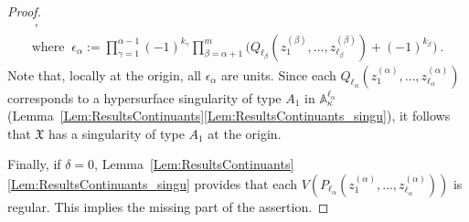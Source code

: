 \documentclass[letter,11pt]{amsart}
\renewcommand{\AA}{\ensuremath{\mathbb{A}}}
\theoremstyle{theorem}
\theoremstyle{definition}
\newcommand{\len}{\ell}
\newcommand{\halflen}{k}
\numberwithin{equation}{section}
\begin{document}
\begin{proof}
\[\begin{array}{c}
		\ , 
		\\[15pt]
		\displaystyle 
		\mbox{where } \ 
		\epsilon_\alpha := 
		\prod_{\gamma=1}^{\alpha-1} (-1)^{\halflen_\gamma}
				\prod_{\beta = \alpha+1}^m \Big( Q_{\len_\beta} (z_1^{(\beta)}, \ldots, z_{\len_\beta}^{(\beta)}) + (-1)^{\halflen_\beta} \Big)
		\ . 
	\end{array}
	\]
	Note that, locally at the origin, all $ \epsilon_\alpha $ are units.
	Since each $ Q_{\len_\alpha} (z_1^{(\alpha)}, \ldots, z_{\len_\alpha}^{(\alpha)}) $ corresponds to a hypersurface singularity of type $ A_1 $ in $ \AA_\kappa^{\len_\alpha} $ (Lemma~\ref{Lem:ResultsContinuants}\eqref{Lem:ResultsContinuants_singu}),
	it follows that $ \mathfrak{X} $ has a singularity of type $ A_1 $ at the origin.  
	  
	 Finally, if $ \delta = 0 $,
	 Lemma~\ref{Lem:ResultsContinuants}\eqref{Lem:ResultsContinuants_singu} provides that each $ V (P_{\len_\alpha} ( z_1^{(\alpha)}, \ldots, z_{\len_\alpha}^{(\alpha)} ) ) $ is regular. 
	 This implies the missing part of the assertion. 
\end{proof}
\end{document}
